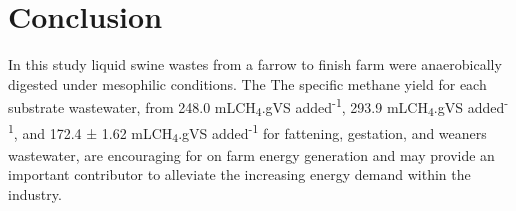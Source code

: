 \section{Conclusion}
In this study liquid swine wastes from a farrow to finish farm were anaerobically digested under mesophilic conditions. The The specific methane yield for each substrate wastewater,  from 248.0 mLCH\textsubscript{4}.gVS added\textsuperscript{-1}, 293.9 mLCH\textsubscript{4}.gVS added\textsuperscript{-1}, and 172.4 ± 1.62 mLCH\textsubscript{4}.gVS added\textsuperscript{-1} for fattening, gestation, and weaners wastewater, are encouraging for on farm energy generation and may provide an important contributor to alleviate the increasing energy demand within the industry.